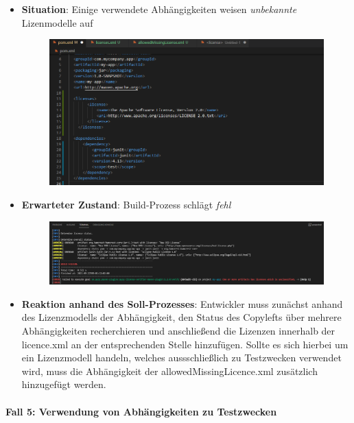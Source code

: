 \begin{itemize}
    \item \textbf{Situation}: Einige verwendete Abhängigkeiten weisen \textit{unbekannte} Lizenmodelle auf
    
    \begin{figure}[h]
        \centering
        \includegraphics[scale=0.5]{Bilder/Fall4Situation.png}
    \end{figure}

    \item \textbf{Erwarteter Zustand}: Build-Prozess schlägt \textit{fehl} 
    
    \begin{figure}[h]
        \centering
        \includegraphics[scale=0.4]{Bilder/Fall4Zustand.png}
    \end{figure}

    \item \textbf{Reaktion anhand des Soll-Prozesses}: Entwickler muss zunächst anhand des Lizenzmodells der Abhängigkeit, den Status des Copylefts über mehrere Abhängigkeiten recherchieren und anschließend die Lizenzen innerhalb der licence.xml an der entsprechenden Stelle hinzufügen. Sollte es sich hierbei um ein Lizenzmodell handeln, welches aussschließlich zu Testzwecken verwendet wird, muss die Abhängigkeit der allowedMissingLicence.xml zusätzlich hinzugefügt werden. 
\end{itemize}

\paragraph{Fall 5: Verwendung von Abhängigkeiten zu Testzwecken} $~$


